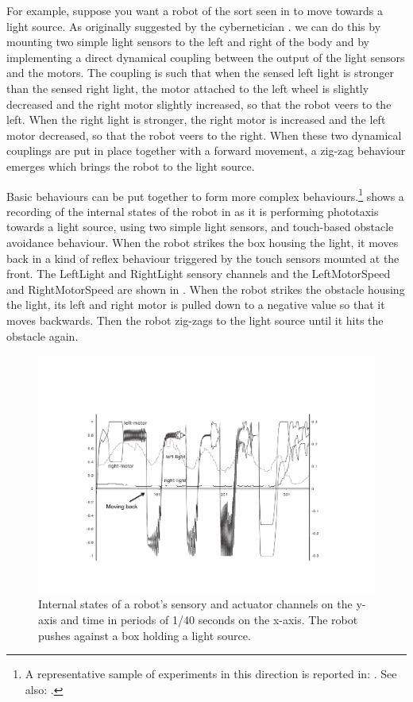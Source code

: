 For example, suppose you want a robot of the sort seen 
in  to move towards a light source. As originally 
suggested by the cybernetician \cite{Braitenberg:1984}. 
we can do this by mounting two simple light sensors 
to the left and right of the body and by implementing a 
direct dynamical coupling between the output of the light
sensors and the motors. The coupling is such that when
the sensed left light is stronger than the sensed right
light, the motor attached
to the left wheel is slightly decreased and the right
motor slightly increased, so that the robot veers to the left. 
When the right light is stronger, the right motor is 
increased and the left motor decreased, so that the 
robot veers to the right. When these two dynamical 
couplings are put in place together with a
forward movement, a zig-zag behaviour emerges which
brings the robot to the light source. 

Basic behaviours can be put together to form 
more complex behaviours.\footnote{A representative sample of experiments in this 
direction is reported in: \cite{Steels:1996}. See 
also: \cite{Arkin:1998}.}
shows a recording of the internal states of the robot
in  as it is performing 
phototaxis towards a light source, using two simple
light sensors, and touch-based obstacle avoidance
behaviour.  When the robot strikes the box housing 
the light, it moves back in a kind of reflex behaviour
triggered by the touch sensors mounted at the front. 
The LeftLight and 
RightLight sensory channels and the LeftMotorSpeed
and RightMotorSpeed are shown 
in . When the robot strikes
the obstacle housing the light, its left and right
motor is pulled down to a negative value so that 
it moves backwards. Then the robot zig-zags to the 
light source until it hits the obstacle again. 

\begin{figure}[htbp]
  \centerline{\includegraphics[width=\textwidth]{chap3/figs/phototaxis.pdf}}
\caption{\label{phototaxis}Internal states of a robot's sensory and actuator channels on 
the y-axis and time in periods of 1/40 seconds on the x-axis.
The robot pushes against a box holding a light source.}
\end{figure}

